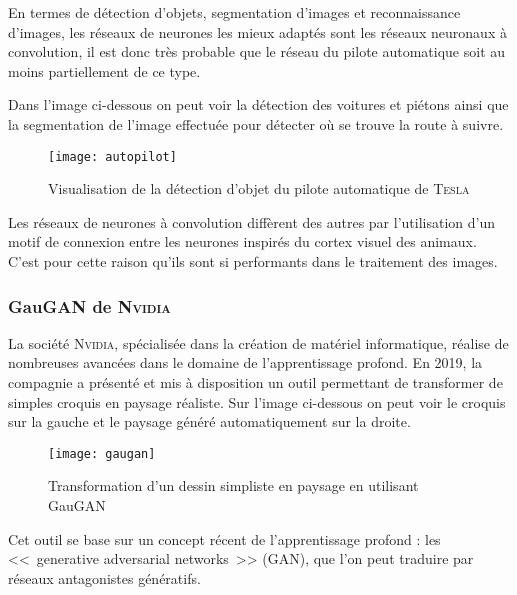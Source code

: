 En termes de détection d'objets, segmentation d'images et reconnaissance d'images, les réseaux de neurones les mieux adaptés sont les réseaux neuronaux à convolution, il est donc très probable que le réseau du pilote automatique soit au moins partiellement de ce type.

Dans l'image ci-dessous on peut voir la détection des voitures et piétons ainsi que la segmentation de l'image effectuée pour détecter où se trouve la route à suivre.

\FloatBarrier
\begin{figure}[h!]
    \begin{center}
        \texttt{[image: autopilot]}
    \end{center}
    \caption{Visualisation de la détection d'objet du pilote automatique de \textsc{Tesla}}
    \label{figure:autopilot}
\end{figure}
\FloatBarrier

Les réseaux de neurones à convolution diffèrent des autres par l'utilisation d'un motif de connexion entre les neurones inspirés du cortex visuel des animaux.
C'est pour cette raison qu'ils sont si performants dans le traitement des images.

\subsubsection{GauGAN de \textsc{Nvidia}}

La société \textsc{Nvidia}, spécialisée dans la création de matériel informatique, réalise de nombreuses avancées dans le domaine de l'apprentissage profond.
En 2019, la compagnie a présenté et mis à disposition un outil permettant de transformer de simples croquis en paysage réaliste.
Sur l'image ci-dessous on peut voir le croquis sur la gauche et le paysage généré automatiquement sur la droite.

\FloatBarrier
\begin{figure}[h!]
    \begin{center}
        \texttt{[image: gaugan]}
    \end{center}
    \caption{Transformation d'un dessin simpliste en paysage en utilisant GauGAN}
    \label{figure:gaugan}
\end{figure}
\FloatBarrier

Cet outil se base sur un concept récent de l'apprentissage profond : les <<~generative adversarial networks~>> (GAN), que l'on peut traduire par réseaux antagonistes génératifs.

